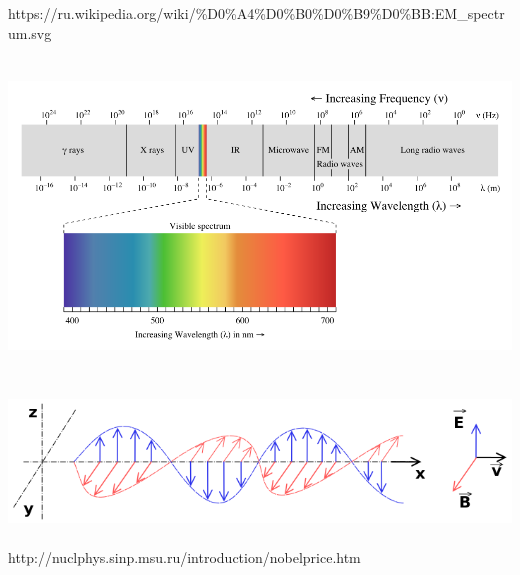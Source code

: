 \documentclass[a4paper,14pt, openany, twoside, draft]{extbook} %
\begin{document}
https://ru.wikipedia.org/wiki/\%D0\%A4\%D0\%B0\%D0\%B9\%D0\%BB:EM\_spectrum.svg

 \includegraphics[width=15.665cm,height=8.382cm]{EMRad-img002.png}

 \includegraphics[width=14.713cm,height=3.627cm]{EMRad-img003.png}

http://nuclphys.sinp.msu.ru/introduction/nobelprice.htm
\end{document}
